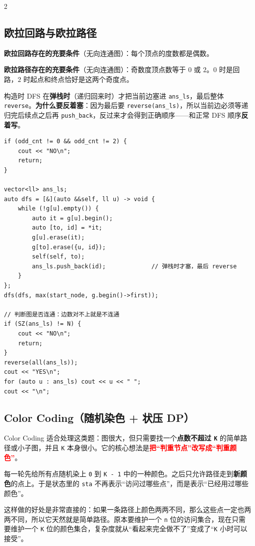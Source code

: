 \begin{multicols*}{2}
		\subsection{欧拉回路与欧拉路径}

		\textbf{欧拉回路存在的充要条件}（无向连通图）：每个顶点的度数都是偶数。

		\textbf{欧拉路径存在的充要条件}（无向连通图）：奇数度顶点数等于 $0$ 或 $2$。$0$ 时是回路，$2$ 时起点和终点恰好是这两个奇度点。

		构造时 DFS 在\textbf{弹栈时}（递归回来时）才把当前边塞进 \texttt{ans\_ls}，最后整体 \texttt{reverse}。\textbf{为什么要反着塞}：因为最后要 \texttt{reverse(ans\_ls)}，所以当前边必须等递归完后续点之后再 \texttt{push\_back}，反过来才会得到正确顺序——和正常 DFS 顺序\textbf{反着写}。

		\begin{verbatim}
if (odd_cnt != 0 && odd_cnt != 2) {
    cout << "NO\n";
    return;
}

vector<ll> ans_ls;
auto dfs = [&](auto &&self, ll u) -> void {
    while (!g[u].empty()) {
        auto it = g[u].begin();
        auto [to, id] = *it;
        g[u].erase(it);
        g[to].erase({u, id});
        self(self, to);
        ans_ls.push_back(id);             // 弹栈时才塞，最后 reverse
    }
};
dfs(dfs, max(start_node, g.begin()->first));

// 判断图是否连通：边数对不上就是不连通
if (SZ(ans_ls) != N) {
    cout << "NO\n";
    return;
}
reverse(all(ans_ls));
cout << "YES\n";
for (auto u : ans_ls) cout << u << " ";
cout << "\n";
		\end{verbatim}


		\subsection{Color Coding（随机染色 + 状压 DP）}

		Color Coding 适合处理这类题：图很大，但只需要找一个\textbf{点数不超过 \texttt{K}} 的简单路径或小子图，并且 \texttt{K} 本身很小。它的核心想法是\textcolor{red}{\textbf{把“判重节点”改写成“判重颜色”}}。

		每一轮先给所有点随机染上 \texttt{0} 到 \texttt{K - 1} 中的一种颜色。之后只允许路径走到\textbf{新颜色}的点上。于是状态里的 \texttt{sta} 不再表示“访问过哪些点”，而是表示“已经用过哪些颜色”。

		这样做的好处是非常直接的：如果一条路径上颜色两两不同，那么这些点一定也两两不同，所以它天然就是简单路径。原本要维护一个 \texttt{n} 位的访问集合，现在只需要维护一个 \texttt{K} 位的颜色集合，复杂度就从“看起来完全做不了”变成了“\texttt{K} 小时可以接受”。


\end{multicols*}
